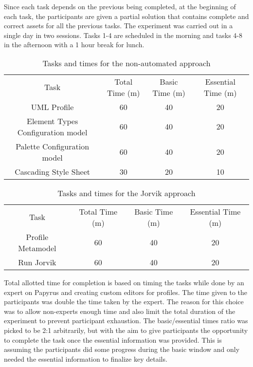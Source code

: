 Since each task depends on the previous being completed, at the beginning of each task, the participants are given a partial solution that contains complete and correct assets for all the previous tasks.
The experiment was carried out in a single day in two sessions.
Tasks 1-4 are scheduled in the morning and tasks 4-8 in the afternoon with a 1 hour break for lunch.

\begin{table}
    \caption{Tasks and times for the non-automated approach}
    \centering
    \setlength{\tabcolsep}{3.5pt} 
    \begin{tabular}{|c|c|c|c|}
        Task & Total Time (m) & Basic Time (m) & Essential Time (m) \\ 
        UML Profile & 60 & 40 & 20 \\
        Element Types Configuration model & 60 & 40 & 20 \\
        Palette Configuration model & 60 & 40 & 20 \\
        Cascading Style Sheet & 30 & 20 & 10 \\
    \end{tabular}
\end{table}

\begin{table}
    \caption{Tasks and times for the Jorvik approach}
    \centering
    \setlength{\tabcolsep}{3.5pt} 
    \begin{tabular}{|c|c|c|c|}
        Task & Total Time (m) & Basic Time (m) & Essential Time (m) \\ 
        Profile Metamodel & 60 & 40 & 20 \\
        Run Jorvik & 60 & 40 & 20 \\
    \end{tabular}
\end{table}



Total allotted time for completion is based on timing the tasks while done by an expert on Papyrus and creating custom editors for profiles.
The time given to the participants was double the time taken by the expert.
The reason for this choice was to allow non-experts enough time and also limit the total duration of the experiment to prevent participant exhaustion.
The basic/essential times ratio was picked to be 2:1 arbitrarily, but with the aim to give participants the opportunity to complete the task once the essential information was provided.
This is assuming the participants did some progress during the basic window and only needed the essential information to finalize key details.

